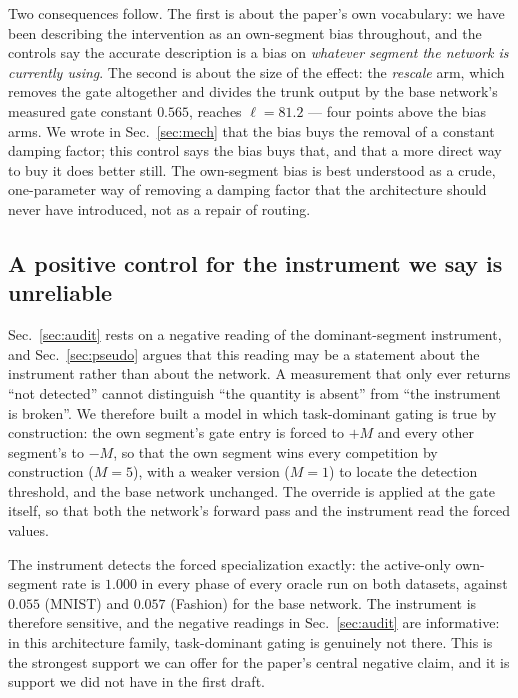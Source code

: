 \documentclass[10pt]{article}
\begin{document}
Two consequences follow. The first is about the paper's own vocabulary:
we have been describing the intervention as an own-segment bias
throughout, and the controls say the accurate description is a bias on
\emph{whatever segment the network is currently using}. The second is
about the size of the effect: the \emph{rescale} arm, which removes the
gate altogether and divides the trunk output by the base network's
measured gate constant $0.565$, reaches $\ell=81.2$ --- four points
above the bias arms. We wrote in Sec.~\ref{sec:mech} that the bias buys
the removal of a constant damping factor; this control says the bias
buys that, and that a more direct way to buy it does better still. The
own-segment bias is best understood as a crude, one-parameter way of
removing a damping factor that the architecture should never have
introduced, not as a repair of routing.

\subsection{A positive control for the instrument we say is unreliable}
\label{sec:ctrl-oracle}

Sec.~\ref{sec:audit} rests on a negative reading of the dominant-segment
instrument, and Sec.~\ref{sec:pseudo} argues that this reading may be a
statement about the instrument rather than about the network. A
measurement that only ever returns ``not detected'' cannot distinguish
``the quantity is absent'' from ``the instrument is broken''. We therefore
built a model in which task-dominant gating is true by construction: the
own segment's gate entry is forced to $+M$ and every other segment's to
$-M$, so that the own segment wins every competition by construction
($M=5$), with a weaker version ($M=1$) to locate the detection
threshold, and the base network unchanged. The override is applied at
the gate itself, so that both the network's forward pass and the
instrument read the forced values.

The instrument detects the forced specialization exactly: the
active-only own-segment rate is $1.000$ in every phase of every oracle
run on both datasets, against $0.055$ (MNIST) and $0.057$ (Fashion) for
the base network. The instrument is therefore sensitive, and the negative
readings in Sec.~\ref{sec:audit} are informative: in this architecture
family, task-dominant gating is genuinely not there. This is the
strongest support we can offer for the paper's central negative claim,
and it is support we did not have in the first draft.
\end{document}

